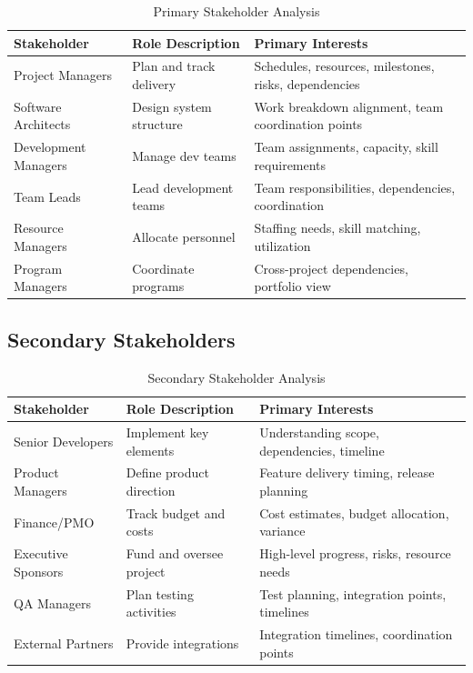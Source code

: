 \documentclass[11pt,letterpaper]{article}
\begin{document}
\begin{table}[H]
\centering
\caption{Primary Stakeholder Analysis}
\small
\begin{tabular}{@{}L{2.6cm}L{3.6cm}L{7cm}@{}}
\toprule
\textbf{Stakeholder} & \textbf{Role Description} & \textbf{Primary Interests} \\
\midrule
Project Managers & Plan and track delivery & Schedules, resources, milestones, risks, dependencies \\
\addlinespace
Software Architects & Design system structure & Work breakdown alignment, team coordination points \\
\addlinespace
Development Managers & Manage dev teams & Team assignments, capacity, skill requirements \\
\addlinespace
Team Leads & Lead development teams & Team responsibilities, dependencies, coordination \\
\addlinespace
Resource Managers & Allocate personnel & Staffing needs, skill matching, utilization \\
\addlinespace
Program Managers & Coordinate programs & Cross-project dependencies, portfolio view \\
\bottomrule
\end{tabular}
\end{table}

\subsection{Secondary Stakeholders}

\begin{table}[H]
\centering
\caption{Secondary Stakeholder Analysis}
\small
\begin{tabular}{@{}L{2.6cm}L{3.6cm}L{7cm}@{}}
\toprule
\textbf{Stakeholder} & \textbf{Role Description} & \textbf{Primary Interests} \\
\midrule
Senior Developers & Implement key elements & Understanding scope, dependencies, timeline \\
\addlinespace
Product Managers & Define product direction & Feature delivery timing, release planning \\
\addlinespace
Finance/PMO & Track budget and costs & Cost estimates, budget allocation, variance \\
\addlinespace
Executive Sponsors & Fund and oversee project & High-level progress, risks, resource needs \\
\addlinespace
QA Managers & Plan testing activities & Test planning, integration points, timelines \\
\addlinespace
External Partners & Provide integrations & Integration timelines, coordination points \\
\bottomrule
\end{tabular}
\end{table}
\end{document}
